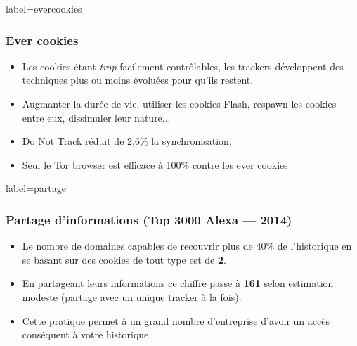 \documentclass{beamer}
\begin{document}
        \begin{frame}{label=evercookies}
            \frametitle{Ever cookies}
            \begin{center}
                \begin{itemize}
                    \item Les cookies étant \textit{trop} facilement contrôlables, les trackers développent des techniques plus ou moins évoluées pour qu'ils restent.
                    \item Augmanter la durée de vie, utiliser les cookies Flash, respawn les cookies entre eux, dissimuler leur nature...
                    \item Do Not Track réduit de 2,6\% la synchronisation.
                    \item Seul le Tor browser est efficace à 100\% contre les ever cookies
                \end{itemize}
            \end{center}
        \end{frame}
        \begin{frame}{label=partage}
            \frametitle{Partage d'informations (Top 3000 Alexa --- 2014)}
            \begin{center}
                \begin{itemize}
                    \item Le nombre de domaines capables de recouvrir plus de 40\% de l'historique en se basant sur des cookies de tout type est de \textbf{2}.
                    \item En partageant leurs informations ce chiffre passe à \textbf{161} selon estimation modeste (partage avec un unique tracker à la fois).
                    \item Cette pratique permet à un grand nombre d'entreprise d'avoir un accès conséquent à votre historique.
                \end{itemize}
            \end{center}
        \end{frame}
\end{document}
